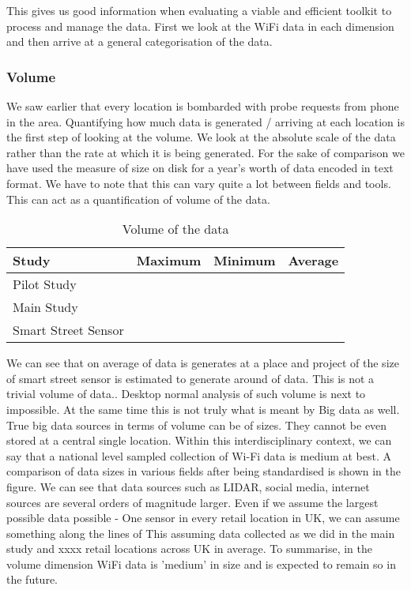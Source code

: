 This gives us good information when evaluating a viable and efficient toolkit to process and manage the data.
First we look at the WiFi data in each dimension and then arrive at a general categorisation of the data.

\subsubsection{Volume}

We saw earlier that every location is bombarded with probe requests from phone in the area.
Quantifying how much data is generated / arriving at each location is the first step of looking at the volume.
We look at the absolute scale of the data rather than the rate at which it is being generated.
For the sake of comparison we have used the measure of size on disk for a year's worth of data encoded in text format.
We have to note that this can vary quite a lot between fields and tools.
This can act as a quantification of volume of the data.

\begin{table}
    \centering
    \begin{tabular}{|l|c|c|c|}
        \hline
        Study & Maximum & Minimum & Average \\
        \hline
        Pilot Study & & & \\
        Main Study & & & \\
        Smart Street Sensor & & & \\
        \hline
    \end{tabular}
    \caption{Volume of the data}
    \label{volume_table}
\end{table}

We can see that on average  of data is generates at a place and project of the size of smart street sensor is estimated to generate around  of data.
This is not a trivial volume of data..
Desktop normal analysis of such volume is next to impossible.
At the same time this is not truly what is meant by Big data as well.
True big data sources in terms of volume can be of  sizes.
They cannot be even stored at a central single location.
Within this interdisciplinary context, we can say that a national level sampled collection of Wi-Fi data is medium at best.
A comparison of data sizes in various fields after being standardised is shown in the figure.
We can see that data sources such as LIDAR, social media, internet sources are several orders of magnitude larger.
Even if we assume the largest possible data possible - One sensor in every retail location in UK, we can assume something along the lines of  This assuming data collected as we did in the main study and xxxx retail locations across UK in average.
To summarise, in the volume dimension WiFi data is 'medium' in size and is expected to remain so in the future.

